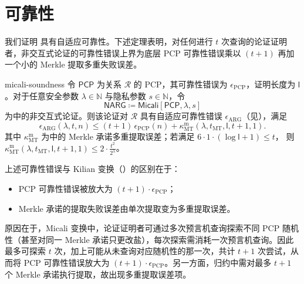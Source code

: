 \documentclass[american,singlepageview]{snargs-book-zh}
\newcommand{\DefineEqual}{\coloneqq}
\newcommand{\Naturals}{\mathbb{N}}
\newcommand{\Relation}{\mathcal{R}}
\newcommand{\InstanceSize}{n}
\newcommand{\ProtoSoundnessError}{\epsilon}
\newcommand{\ProtoKnowledgeError}{\kappa}
\newcommand{\ProtoProofLength}{\mathsf{l}}
\newcommand{\PCPSymbol}{\mathsf{PCP}}
\newcommand{\PCPSubscript}{\scriptscriptstyle\mathrm{PCP}}
\newcommand{\PCPSoundnessError}{\ProtoSoundnessError_{\PCPSubscript}}
\newcommand{\PCPProofLength}{\ProtoProofLength}
\newcommand{\NARGSymbol}{\mathsf{NARG}}
\newcommand{\ARGSubscript}{\scriptscriptstyle\mathrm{ARG}}
\newcommand{\ARGSoundnessError}{\ProtoSoundnessError_{\ARGSubscript}}
\newcommand{\ROQueryBound}{t}
\newcommand{\SecurityParameter}{\lambda}
\newcommand{\PrivacyParameter}{s}
\newcommand{\ROTreeSymbol}{\MTSubscript}
\newcommand{\ROTreeQueryBound}{\ROQueryBound_{\ROTreeSymbol}}
\newcommand{\MTSubscript}{{\scriptscriptstyle\mathrm{MT}}}
\newcommand{\MTMultiSymbol}{\scriptscriptstyle{\mathrm{m}}}
\newcommand{\MTMultiExtractionError}{\ProtoKnowledgeError_{\MTSubscript}^{\MTMultiSymbol}}
\newcommand{\FormatTransName}[1]{\bm{\mathsf{#1}}}
\newcommand{\MicaliSymbol}{\FormatTransName{Micali}}
\newcommand{\FormatTransInputs}[3]{[#1,#2,#3]}
\newcommand{\MicaliTransformation}[3]{\MicaliSymbol\FormatTransInputs{#1}{#2}{#3}}
\newcommand{\MTMultiExtractabilityShortExpression}[2]{2 \cdot \frac{#2^2}{2^{#1}}}
\newcommand{\MTMultiExtractabilityCondition}[3]{6 \cdot #2 \cdot (#3+1) \leq #1}
\begin{document}
\section{可靠性}
\label{section:micali-soundness}

我们证明 具有自适应可靠性。下述定理表明，对任何进行 $\ROQueryBound$ 次查询的论证证明者，非交互式论证的可靠性错误上界为底层 PCP 可靠性错误乘以 $(\ROQueryBound+1)$ 再加一个小的 Merkle 提取多重失败误差。

\begin{ImportantTheorem}{}{micali-soundness}
令 $\PCPSymbol$ 为关系 $\Relation$ 的 PCP，其可靠性错误为 $\PCPSoundnessError$，证明长度为 $\PCPProofLength$。对于任意安全参数 $\SecurityParameter\in\Naturals$ 与隐私参数 $\PrivacyParameter\in\Naturals$，令
\[
  \NARGSymbol\DefineEqual\MicaliTransformation{\PCPSymbol}{\SecurityParameter}{\PrivacyParameter}
\]
为中的非交互式论证。则该论证对 $\Relation$ 具有自适应可靠性错误 $\ARGSoundnessError$（见），满足
\[
  \ARGSoundnessError(\SecurityParameter,\ROQueryBound,\InstanceSize)
  \le
  (\ROQueryBound+1)\,\PCPSoundnessError(\InstanceSize)
  +
  \MTMultiExtractionError(\SecurityParameter,\ROTreeQueryBound,\PCPProofLength,\ROQueryBound+1,1).
\]
其中 $\MTMultiExtractionError$ 为中的 Merkle 承诺多重提取误差；若满足
$\MTMultiExtractabilityCondition{\ROQueryBound}{1}{\log\PCPProofLength}$，
则
\(\MTMultiExtractionError(\SecurityParameter,\ROTreeQueryBound,\PCPProofLength,\ROQueryBound+1,1)
\le\MTMultiExtractabilityShortExpression{\SecurityParameter}{\ROQueryBound}\)。
\end{ImportantTheorem}

上述可靠性错误与 Kilian 变换（）的区别在于：
\begin{itemize}[noitemsep]
  \item PCP 可靠性错误被放大为 $(\ROQueryBound+1)\cdot\PCPSoundnessError$；
  \item Merkle 承诺的提取失败误差由单次提取变为多重提取误差。
\end{itemize}
原因在于，Micali 变换中，论证证明者可通过多次预言机查询探索不同 PCP 随机性（甚至对同一 Merkle 承诺只更改盐），每次探索需消耗一次预言机查询。因此最多可探索 $\ROQueryBound$ 次，加上可能从未查询对应随机性的那一次，共计 $\ROQueryBound+1$ 次尝试，从而将 PCP 可靠性错误放大为 $(\ROQueryBound+1)\cdot\PCPSoundnessError$。另一方面，归约中需对最多 $\ROQueryBound+1$ 个 Merkle 承诺执行提取，故出现多重提取误差项。
\end{document}
